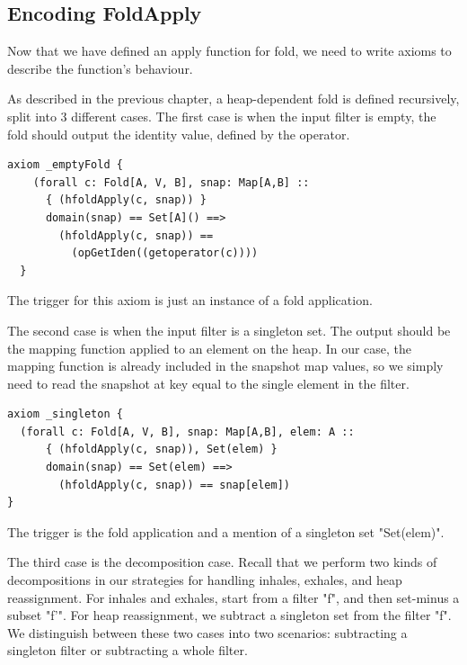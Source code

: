 \documentclass[msc,oneside]{ubcthesis}
\theoremstyle{definition}
\begin{document}
\subsection{Encoding FoldApply}
Now that we have defined an apply function for fold, we need to write axioms to describe the function's behaviour. 

As described in the previous chapter, a heap-dependent fold is defined recursively, split into 3 different cases. The first case is when the input filter is empty, the fold should output the identity value, defined by the operator.
\begin{lstlisting}
axiom _emptyFold {
    (forall c: Fold[A, V, B], snap: Map[A,B] ::
      { (hfoldApply(c, snap)) }
      domain(snap) == Set[A]() ==>
        (hfoldApply(c, snap)) == 
          (opGetIden((getoperator(c))))
  }
\end{lstlisting}
The trigger for this axiom is just an instance of a fold application.

The second case is when the input filter is a singleton set. The output should be the mapping function applied to an element on the heap. In our case, the mapping function is already included in the snapshot map values, so we simply need to read the snapshot at key equal to the single element in the filter.
\begin{lstlisting}
axiom _singleton {
  (forall c: Fold[A, V, B], snap: Map[A,B], elem: A ::
      { (hfoldApply(c, snap)), Set(elem) }
      domain(snap) == Set(elem) ==>
        (hfoldApply(c, snap)) == snap[elem])
}
\end{lstlisting}
The trigger is the fold application and a mention of a singleton set "Set(elem)". 

The third case is the decomposition case. Recall that we perform two kinds of decompositions in our strategies for handling inhales, exhales, and heap reassignment. For inhales and exhales, start from a filter "f", and then set-minus a subset "f'". For heap reassignment, we subtract a singleton set from the filter "f". We distinguish between these two cases into two scenarios: subtracting a singleton filter or subtracting a whole filter.
\end{document}
